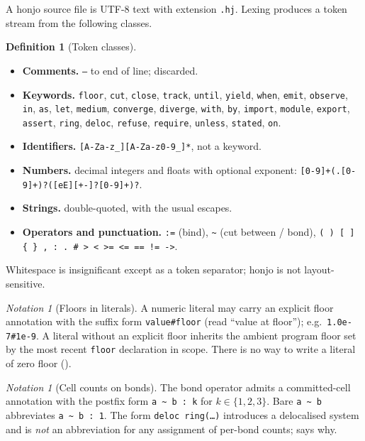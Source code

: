 \documentclass[11pt,twocolumn,a4paper]{article}
\theoremstyle{thmstyle}
\theoremstyle{definition}
\newtheorem{definition}[theorem]{Definition}
\theoremstyle{remark}
\newtheorem{notation}[theorem]{Notation}
\newcommand{\hj}[1]{\texttt{#1}}
\begin{document}
A honjo source file is UTF-8 text with extension \hj{.hj}. Lexing
produces a token stream from the following classes.

\begin{definition}[Token classes]
\label{def:tokens}
\leavevmode
\begin{itemize}[leftmargin=1.4em,itemsep=1pt]
\item \textbf{Comments.} \hj{--} to end of line; discarded.
\item \textbf{Keywords.} \hj{floor}, \hj{cut}, \hj{close}, \hj{track},
\hj{until}, \hj{yield}, \hj{when}, \hj{emit}, \hj{observe},
\hj{in}, \hj{as}, \hj{let}, \hj{medium}, \hj{converge}, \hj{diverge},
\hj{with}, \hj{by}, \hj{import}, \hj{module}, \hj{export}, \hj{assert},
\hj{ring}, \hj{deloc}, \hj{refuse}, \hj{require}, \hj{unless},
\hj{stated}, \hj{on}.
\item \textbf{Identifiers.} \hj{[A-Za-z\_][A-Za-z0-9\_]*}, not a keyword.
\item \textbf{Numbers.} decimal integers and floats with optional
exponent: \hj{[0-9]+(.[0-9]+)?([eE][+-]?[0-9]+)?}.
\item \textbf{Strings.} double-quoted, with the usual escapes.
\item \textbf{Operators and punctuation.} \hj{:=} (bind), \hj{\~{}} (cut
between / bond), \hj{( ) [ ] \{ \} , : . \# > < >= <= == != ->}.
\end{itemize}
Whitespace is insignificant except as a token separator; honjo is not
layout-sensitive.
\end{definition}

\begin{notation}[Floors in literals]
\label{not:literals}
A numeric literal may carry an explicit floor annotation with the suffix
form \hj{value\#floor} (read ``value at floor''); e.g.\ \hj{1.0e-7\#1e-9}.
A literal without an explicit floor inherits the ambient program floor set
by the most recent \hj{floor} declaration in scope. There is no way to
write a literal of zero floor ().
\end{notation}

\begin{notation}[Cell counts on bonds]
\label{not:cells}
The bond operator admits a committed-cell annotation with the postfix
form \hj{a \~{} b : k} for $k\in\{1,2,3\}$. Bare \hj{a \~{} b} abbreviates
\hj{a \~{} b : 1}. The form \hj{deloc ring(\ldots)} introduces a
delocalised system and is \emph{not} an abbreviation for any assignment
of per-bond counts;  says why.
\end{notation}
\end{document}
